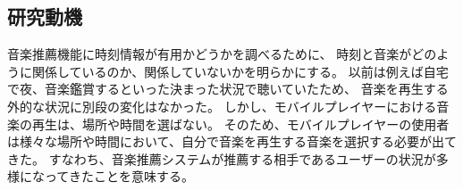 \documentclass[11pt, onecolumn]{jsarticle}
\begin{document}
%

\subsection{研究動機}

音楽推薦機能に時刻情報が有用かどうかを調べるために、
時刻と音楽がどのように関係しているのか、関係していないかを明らかにする。
以前は例えば自宅で夜、音楽鑑賞するといった決まった状況で聴いていたため、
音楽を再生する外的な状況に別段の変化はなかった。
しかし、モバイルプレイヤーにおける音楽の再生は、場所や時間を選ばない。
そのため、モバイルプレイヤーの使用者は様々な場所や時間において、自分で音楽を再生する音楽を選択する必要が出てきた。
すなわち、音楽推薦システムが推薦する相手であるユーザーの状況が多様になってきたことを意味する。
\end{document}
